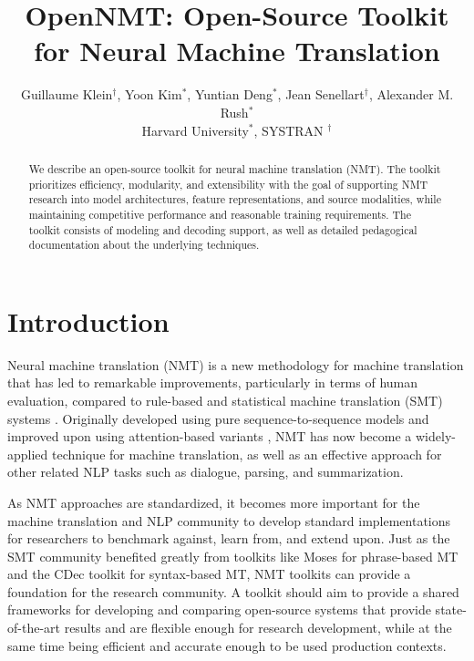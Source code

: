 \documentclass[11pt]{article}
\title{OpenNMT: Open-Source Toolkit for Neural Machine Translation}
\author{Guillaume Klein$^\dagger$, Yoon Kim$^*$, Yuntian Deng$^*$, Jean Senellart$^\dagger$, Alexander M. Rush$^*$ \\ Harvard University$^*$, SYSTRAN $^\dagger$}
\date{}
\begin{document}
\maketitle
\begin{abstract}

  We describe an open-source toolkit for neural machine translation
  (NMT).  The toolkit prioritizes efficiency, modularity, and
  extensibility with the goal of supporting NMT research into model
  architectures, feature representations, and source modalities, while
  maintaining competitive performance and reasonable training
  requirements. The toolkit consists of modeling and decoding support,
  as well as detailed pedagogical documentation about the underlying
  techniques.

\end{abstract}

\section{Introduction}


Neural machine translation (NMT) is a new methodology for machine
translation that has led to remarkable improvements, particularly in
terms of human evaluation, compared to rule-based
and statistical machine translation (SMT) systems
\cite{wu2016google,systran}. Originally developed using pure
sequence-to-sequence models \cite{sutskever14sequence,Cho2014} and
improved upon using attention-based variants \cite{Bahdanau2015,Luong2015}, NMT has now become a widely-applied technique for machine
translation, as well as an effective approach for other related NLP
tasks such as dialogue, parsing, and summarization.

As NMT approaches are standardized, it becomes more important for the
machine translation and NLP community to develop standard
implementations for researchers to benchmark against, learn from, and
extend upon. Just as the SMT community benefited greatly from toolkits
like Moses \cite{koehn2007moses} for phrase-based MT and the CDec
toolkit \cite{dyer2010cdec} for syntax-based MT, NMT toolkits can
provide a foundation for the research community. A toolkit should aim
to provide a shared frameworks for developing and comparing
open-source systems that provide state-of-the-art results and are
flexible enough for research development, while at the same time being
efficient and accurate enough to be used production contexts.
\end{document}
